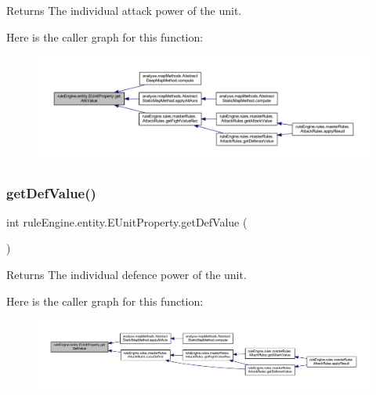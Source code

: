 \begin{DoxyReturn}{Returns}
The individual attack power of the unit. 
\end{DoxyReturn}
Here is the caller graph for this function\+:
\nopagebreak
\begin{figure}[H]
\begin{center}
\leavevmode
\includegraphics[width=350pt]{enumrule_engine_1_1entity_1_1_e_unit_property_a827c762c3ba5f1bde2858d069506087c_icgraph}
\end{center}
\end{figure}
\mbox{\label{enumrule_engine_1_1entity_1_1_e_unit_property_a05066d575b2ab489f18315a9185729ce}} 
\subsubsection{\texorpdfstring{get\+Def\+Value()}{getDefValue()}}
{\footnotesize\ttfamily int rule\+Engine.\+entity.\+E\+Unit\+Property.\+get\+Def\+Value (\begin{DoxyParamCaption}{ }\end{DoxyParamCaption})\hspace{0.3cm}{\ttfamily [inline]}}

\begin{DoxyReturn}{Returns}
The individual defence power of the unit. 
\end{DoxyReturn}
Here is the caller graph for this function\+:
\nopagebreak
\begin{figure}[H]
\begin{center}
\leavevmode
\includegraphics[width=350pt]{enumrule_engine_1_1entity_1_1_e_unit_property_a05066d575b2ab489f18315a9185729ce_icgraph}
\end{center}
\end{figure}
\mbox{\label{enumrule_engine_1_1entity_1_1_e_unit_property_a782bb3fd07719464f8f5d72f4c79b226}} 
